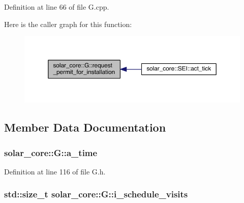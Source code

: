 Definition at line 66 of file G.\+cpp.



Here is the caller graph for this function\+:\nopagebreak
\begin{figure}[H]
\begin{center}
\leavevmode
\includegraphics[width=350pt]{classsolar__core_1_1_g_a615600f35d73a38ea48e99909fff5085_icgraph}
\end{center}
\end{figure}




\subsection{Member Data Documentation}
\hypertarget{classsolar__core_1_1_g_a4d5b2845fc790c0f14b13fe922821f4b}{}
\subsubsection[{a\+\_\+time}]{ solar\+\_\+core\+::\+G\+::a\+\_\+time\hspace{0.3cm}{\ttfamily [protected]}}\label{classsolar__core_1_1_g_a4d5b2845fc790c0f14b13fe922821f4b}


Definition at line 116 of file G.\+h.

\hypertarget{classsolar__core_1_1_g_a5c79440fcadc7d3e9212c5e7c05f84f7}{}
\subsubsection[{i\+\_\+schedule\+\_\+visits}]{\setlength{\rightskip}{0pt plus 5cm}std\+::size\+\_\+t solar\+\_\+core\+::\+G\+::i\+\_\+schedule\+\_\+visits\hspace{0.3cm}{\ttfamily [protected]}}\label{classsolar__core_1_1_g_a5c79440fcadc7d3e9212c5e7c05f84f7}


